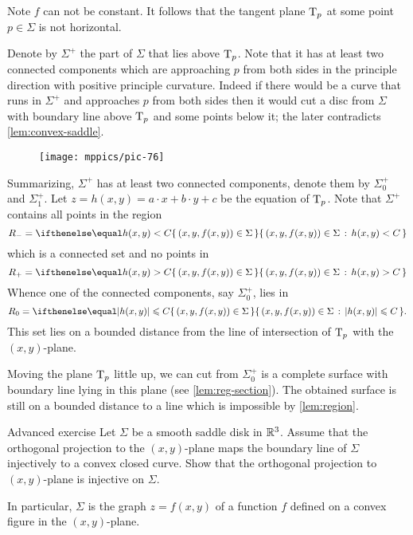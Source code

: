 Note $f$ can not be constant.
It follows that the tangent plane $\mathrm{T}_p$ at some point $p\in\Sigma$ is not horizontal.

Denote by $\Sigma^+$ the part of $\Sigma$ that lies above $\mathrm{T}_p$.
Note that it has at least two connected components which are approaching $p$ from both sides 
in the principle direction with positive principle curvature.
Indeed if there would be a curve that runs in $\Sigma^+$ and approaches $p$ from both sides then it would cut a disc from $\Sigma$ with boundary line above $\mathrm{T}_p$ and some points below it;
the later contradicts \ref{lem:convex-saddle}.

\begin{figure}[h!]
\vskip-0mm
\centering
\texttt{[image: mppics/pic-76]}
\vskip0mm
\end{figure}

Summarizing, $\Sigma^+$ has at least two connected components, denote them by $\Sigma^+_0$ and $\Sigma^+_1$.
Let $z=h(x,y)=a\cdot x+b\cdot y+c$ be the equation of $\mathrm{T}_p$.
Note that $\Sigma^+$ contains all points in the region
\[R_-=\set{(x,y,f(x,y))\in\Sigma}{h(x,y)< C}\] 
which is a connected set and no points in 
\[R_+=\set{(x,y,f(x,y))\in\Sigma}{h(x,y)> C}\]
Whence one of the connected components, say $\Sigma^+_0$, lies in 
\[R_0=\set{(x,y,f(x,y))\in\Sigma}{|h(x,y)|\le  C}.\]
This set lies on a bounded distance from the line of intersection of $\mathrm{T}_p$ with the $(x,y)$-plane.

Moving the plane $\mathrm{T}_p$ little up, we can cut from $\Sigma^+_0$ is a complete surface with boundary line lying in this plane (see \ref{lem:reg-section}).
The obtained surface is still on a bounded distance to a line
which is impossible by \ref{lem:region}.
\qeds

\begin{thm}{Advanced exercise}
Let $\Sigma$ be a smooth saddle disk in $\mathbb{R}^3$.
Assume that the orthogonal projection to the $(x,y)$-plane
maps the boundary line of $\Sigma$
injectively to a convex closed curve.
Show that the orthogonal projection to $(x,y)$-plane is injective on $\Sigma$.

In particular, $\Sigma$ is the graph $z=f(x,y)$ of a function $f$ defined on a convex figure in the $(x,y)$-plane.
\end{thm}


